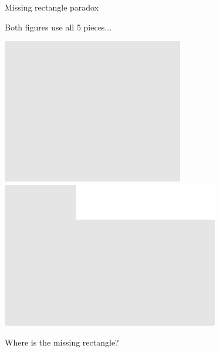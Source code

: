 \documentclass[14pt]{beamer}
\begin{document}

    \begin{frame}{Missing rectangle paradox}
        \begin{center}
            Both figures use all 5 pieces...

            \vspace{36pt}

            \;\;\includegraphics[scale=0.5]{figures/figure022b.pdf}\qquad
            \qquad
            \includegraphics[scale=0.5]{figures/figure022z.pdf}

            \vspace{32pt}

            Where is the missing rectangle?
        \end{center}
    \end{frame}
\end{document}
